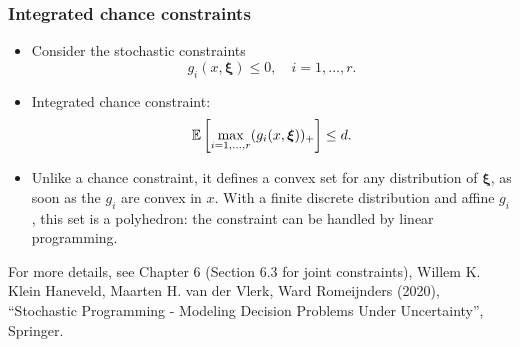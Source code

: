 \documentclass[aspectratio=169]{beamer}
\def\bxi{\boldsymbol\xi}
\begin{document}
\begin{frame}
\frametitle{Integrated chance constraints}

\begin{itemize}
\item 
Consider the stochastic constraints
\[
g_i(x, \bxi) \leq 0, \quad i = 1,\ldots, r.
\]
\item
Integrated chance constraint:
\[
\EE \left[ \max_{i=1,\ldots,r} (g_i(x,\bxi))_+ \right] \leq d.
\]
\item
Unlike a chance constraint, it defines a {\red convex set for any distribution} of $\bxi$, as soon as the $g_i$ are convex in $x$.
With a finite discrete distribution and affine $g_i$, this set is a polyhedron: the constraint can be handled by linear programming.
\end{itemize}

\smallskip

{\footnotesize For more details, see Chapter 6 (Section 6.3 for joint constraints), Willem K. Klein Haneveld, Maarten H. van der Vlerk, Ward Romeijnders (2020), ``Stochastic Programming - Modeling Decision Problems Under Uncertainty'', Springer.\par}
\end{frame}

\end{document}
